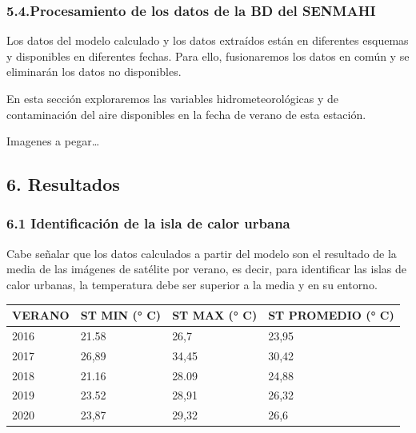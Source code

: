 \documentclass[
]{article}
\begin{document}
\hypertarget{procesamiento-de-los-datos-de-la-bd-del-senmahi}{%
\subsubsection{5.4.Procesamiento de los datos de la BD del
SENMAHI}\label{procesamiento-de-los-datos-de-la-bd-del-senmahi}}

Los datos del modelo calculado y los datos extraídos están en diferentes
esquemas y disponibles en diferentes fechas. Para ello, fusionaremos los
datos en común y se eliminarán los datos no disponibles.

En esta sección exploraremos las variables hidrometeorológicas y de
contaminación del aire disponibles en la fecha de verano de esta
estación.

Imagenes a pegar\ldots{}

\hypertarget{resultados}{%
\subsection{6. Resultados}\label{resultados}}

\hypertarget{identificaciuxf3n-de-la-isla-de-calor-urbana}{%
\subsubsection{6.1 Identificación de la isla de calor
urbana}\label{identificaciuxf3n-de-la-isla-de-calor-urbana}}

Cabe señalar que los datos calculados a partir del modelo son el
resultado de la media de las imágenes de satélite por verano, es decir,
para identificar las islas de calor urbanas, la temperatura debe ser
superior a la media y en su entorno.

\begin{longtable}[]{@{}llll@{}}
\toprule
VERANO & ST MIN (° C) & ST MAX (° C) & ST PROMEDIO (° C)\tabularnewline
\midrule
\endhead
2016 & 21.58 & 26,7 & 23,95\tabularnewline
2017 & 26,89 & 34,45 & 30,42\tabularnewline
2018 & 21.16 & 28.09 & 24,88\tabularnewline
2019 & 23.52 & 28,91 & 26,32\tabularnewline
2020 & 23,87 & 29,32 & 26,6\tabularnewline
\bottomrule
\end{longtable}
\end{document}
